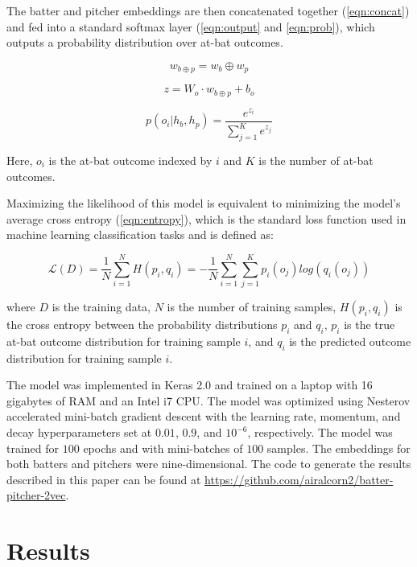 \documentclass{article}
\begin{document}
The batter and pitcher embeddings are then concatenated together (\ref{eqn:concat}) and fed into a standard softmax layer (\ref{eqn:output} and \ref{eqn:prob}), which outputs a probability distribution over at-bat outcomes.

\begin{equation}
\label{eqn:concat}
w_{b \oplus p} = w_b \oplus w_p
\end{equation}

\begin{equation}
\label{eqn:output}
z = W_o \cdot w_{b \oplus p} + b_o
\end{equation}

\begin{equation}
\label{eqn:prob}
p(o_i | h_b, h_p) = \frac{e^{z_i}}{\sum_{j=1}^{K} e^{z_j}}
\end{equation}

Here, $o_i$ is the at-bat outcome indexed by $i$ and $K$ is the number of at-bat outcomes.

Maximizing the likelihood of this model is equivalent to minimizing the model's average cross entropy (\ref{eqn:entropy}), which is the standard loss function used in machine learning classification tasks and is defined as:

\begin{equation}
\label{eqn:entropy}
\mathcal{L}(D) = \frac{1}{N}\sum_{i=1}^{N}H(p_i,q_i) = -\frac{1}{N}\sum_{i=1}^{N}\sum_{j=1}^{K} p_i(o_j)log(q_i(o_j))
\end{equation}

where $D$ is the training data, $N$ is the number of training samples, $H(p_i,q_i)$ is the cross entropy between the probability distributions $p_i$ and $q_i$, $p_i$ is the true at-bat outcome distribution for training sample $i$, and $q_i$ is the predicted outcome distribution for training sample $i$.

The model was implemented in Keras 2.0 \parencite{Keras2015} and trained on a laptop with 16 gigabytes of RAM and an Intel i7 CPU. The model was optimized using Nesterov accelerated mini-batch gradient descent with the learning rate, momentum, and decay hyperparameters set at $0.01$, $0.9$, and $10^{-6}$, respectively. The model was trained for $100$ epochs and with mini-batches of $100$ samples. The embeddings for both batters and pitchers were nine-dimensional. The code to generate the results described in this paper can be found at \url{https://github.com/airalcorn2/batter-pitcher-2vec}.

\section{Results}
\label{results}
\end{document}
